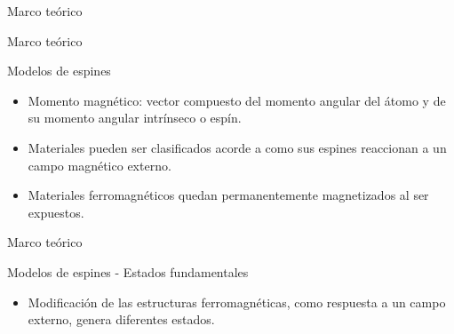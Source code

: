 \begin{frame}
\vfill
\begin{center}
\begin{block}{\begin{center}\begin{Huge}Marco teórico\end{Huge}\end{center}}
\end{block}
\end{center}
\end{frame}

\begin{frame}{Marco teórico}
\begin{block}{Modelos de espines}
\begin{itemize}
  \item Momento magnético: vector compuesto del momento angular del átomo y de su momento angular intrínseco o espín.
  \item Materiales pueden ser clasificados acorde a como sus espines reaccionan a un campo magnético externo.
  \item Materiales ferromagnéticos quedan permanentemente magnetizados al ser expuestos.
\end{itemize}
\end{block}
\end{frame}

\begin{frame}{Marco teórico}
\begin{block}{Modelos de espines - Estados fundamentales}
\begin{itemize}
  \item Modificación de las estructuras ferromagnéticas, como respuesta a un campo externo, genera diferentes estados.
\end{itemize}
\centerline{}
\end{block}
\end{frame}

